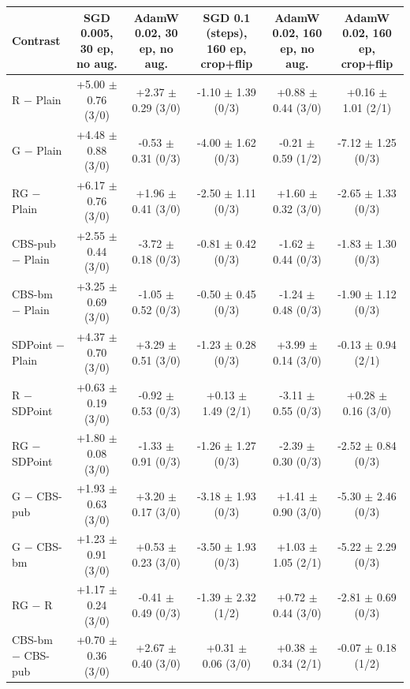 \begin{tabular}{lccccc}
\toprule
Contrast & SGD 0.005, 30 ep, no aug. & AdamW 0.02, 30 ep, no aug. & SGD 0.1 (steps), 160 ep, crop+flip & AdamW 0.02, 160 ep, no aug. & AdamW 0.02, 160 ep, crop+flip \\
\midrule
R $-$ Plain & +5.00 $\pm$ 0.76 (3/0) & +2.37 $\pm$ 0.29 (3/0) & -1.10 $\pm$ 1.39 (0/3) & +0.88 $\pm$ 0.44 (3/0) & +0.16 $\pm$ 1.01 (2/1) \\
G $-$ Plain & +4.48 $\pm$ 0.88 (3/0) & -0.53 $\pm$ 0.31 (0/3) & -4.00 $\pm$ 1.62 (0/3) & -0.21 $\pm$ 0.59 (1/2) & -7.12 $\pm$ 1.25 (0/3) \\
RG $-$ Plain & +6.17 $\pm$ 0.76 (3/0) & +1.96 $\pm$ 0.41 (3/0) & -2.50 $\pm$ 1.11 (0/3) & +1.60 $\pm$ 0.32 (3/0) & -2.65 $\pm$ 1.33 (0/3) \\
CBS-pub $-$ Plain & +2.55 $\pm$ 0.44 (3/0) & -3.72 $\pm$ 0.18 (0/3) & -0.81 $\pm$ 0.42 (0/3) & -1.62 $\pm$ 0.44 (0/3) & -1.83 $\pm$ 1.30 (0/3) \\
CBS-bm $-$ Plain & +3.25 $\pm$ 0.69 (3/0) & -1.05 $\pm$ 0.52 (0/3) & -0.50 $\pm$ 0.45 (0/3) & -1.24 $\pm$ 0.48 (0/3) & -1.90 $\pm$ 1.12 (0/3) \\
SDPoint $-$ Plain & +4.37 $\pm$ 0.70 (3/0) & +3.29 $\pm$ 0.51 (3/0) & -1.23 $\pm$ 0.28 (0/3) & +3.99 $\pm$ 0.14 (3/0) & -0.13 $\pm$ 0.94 (2/1) \\
R $-$ SDPoint & +0.63 $\pm$ 0.19 (3/0) & -0.92 $\pm$ 0.53 (0/3) & +0.13 $\pm$ 1.49 (2/1) & -3.11 $\pm$ 0.55 (0/3) & +0.28 $\pm$ 0.16 (3/0) \\
RG $-$ SDPoint & +1.80 $\pm$ 0.08 (3/0) & -1.33 $\pm$ 0.91 (0/3) & -1.26 $\pm$ 1.27 (0/3) & -2.39 $\pm$ 0.30 (0/3) & -2.52 $\pm$ 0.84 (0/3) \\
G $-$ CBS-pub & +1.93 $\pm$ 0.63 (3/0) & +3.20 $\pm$ 0.17 (3/0) & -3.18 $\pm$ 1.93 (0/3) & +1.41 $\pm$ 0.90 (3/0) & -5.30 $\pm$ 2.46 (0/3) \\
G $-$ CBS-bm & +1.23 $\pm$ 0.91 (3/0) & +0.53 $\pm$ 0.23 (3/0) & -3.50 $\pm$ 1.93 (0/3) & +1.03 $\pm$ 1.05 (2/1) & -5.22 $\pm$ 2.29 (0/3) \\
RG $-$ R & +1.17 $\pm$ 0.24 (3/0) & -0.41 $\pm$ 0.49 (0/3) & -1.39 $\pm$ 2.32 (1/2) & +0.72 $\pm$ 0.44 (3/0) & -2.81 $\pm$ 0.69 (0/3) \\
CBS-bm $-$ CBS-pub & +0.70 $\pm$ 0.36 (3/0) & +2.67 $\pm$ 0.40 (3/0) & +0.31 $\pm$ 0.06 (3/0) & +0.38 $\pm$ 0.34 (2/1) & -0.07 $\pm$ 0.18 (1/2) \\
\bottomrule
\end{tabular}
